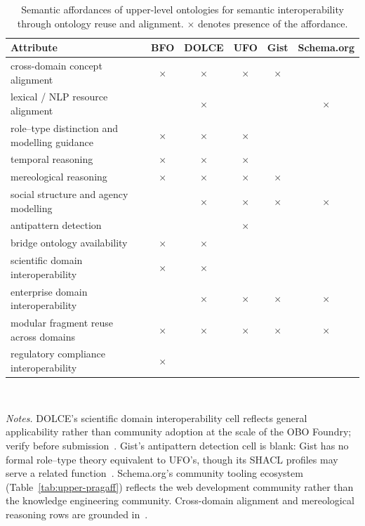 % 
%

\begin{table}[t]
\caption{Semantic affordances of upper-level ontologies for semantic
         interoperability through ontology reuse and alignment.
         $\times$ denotes presence of the affordance.}
\label{tab:upper-semaff}
\centering
\small
\begin{tabular}{lccccc}
\hline
\textbf{Attribute}
  & \textbf{BFO}
  & \textbf{DOLCE}
  & \textbf{UFO}
  & \textbf{Gist}
  & \textbf{Schema.org} \\
\hline
cross-domain concept alignment
  & $\times$ & $\times$ & $\times$ & $\times$ & \\
lexical / NLP resource alignment
  & & $\times$ & & & $\times$ \\
role--type distinction and modelling guidance
  & $\times$ & $\times$ & $\times$ & & \\
temporal reasoning
  & $\times$ & $\times$ & $\times$ & & \\
mereological reasoning
  & $\times$ & $\times$ & $\times$ & $\times$ & \\
social structure and agency modelling
  & & $\times$ & $\times$ & $\times$ & $\times$ \\
antipattern detection
  & & & $\times$ & & \\
bridge ontology availability
  & $\times$ & $\times$ & & & \\
scientific domain interoperability
  & $\times$ & $\times$ & & & \\
enterprise domain interoperability
  & & $\times$ & $\times$ & $\times$ & $\times$ \\
modular fragment reuse across domains
  & $\times$ & $\times$ & $\times$ & $\times$ & $\times$ \\
regulatory compliance interoperability
  & $\times$ & & & & \\
\hline
\end{tabular}
\\[4pt]
\raggedright\footnotesize
\textit{Notes.}
DOLCE's scientific domain interoperability cell reflects general
applicability rather than community adoption at the scale of the OBO
Foundry; verify before submission~\cite{keet2011}.
Gist's antipattern detection cell is blank: Gist has no formal
role--type theory equivalent to UFO's, though its SHACL profiles
may serve a related function~\cite{semanticarts}.
Schema.org's community tooling ecosystem (Table~\ref{tab:upper-pragaff})
reflects the web development community rather than the knowledge
engineering community.
Cross-domain alignment and mereological reasoning rows are grounded
in~\cite{khan2013}.
\end{table}

